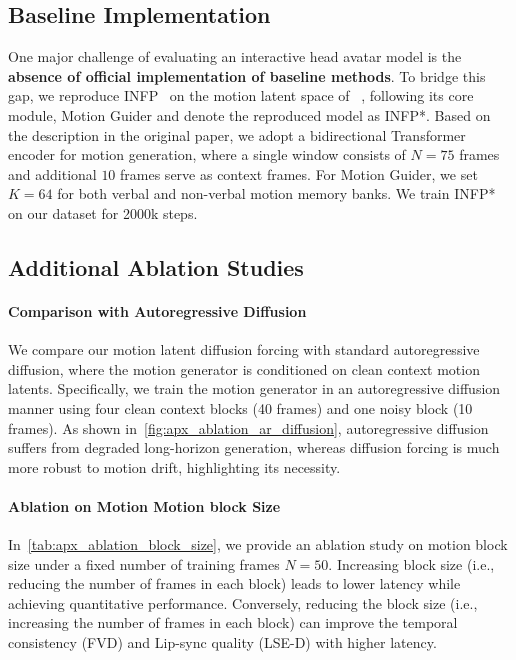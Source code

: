 \subsection{Baseline Implementation}
One major challenge of evaluating an interactive head avatar model is the \textbf{absence of official implementation of baseline methods}. To bridge this gap, we reproduce INFP~\citep{infp} on the motion latent space of ~\citep{float}, following its core module, Motion Guider and denote the reproduced model as INFP*. Based on the description in the original paper, we adopt a bidirectional Transformer encoder for motion generation, where a single window consists of $N=75$ frames and additional $10$ frames serve as context frames. For Motion Guider, we set $K=64$ for both verbal and non-verbal motion memory banks. We train INFP* on our dataset for 2000k steps.

\subsection{Additional Ablation Studies}\label{sec:apx_additional_ablation}
\paragraph{Comparison with Autoregressive Diffusion} We compare our motion latent diffusion forcing with standard autoregressive diffusion, where the motion generator is conditioned on clean context motion latents. Specifically, we train the motion generator in an autoregressive diffusion manner using four clean context blocks (40 frames) and one noisy block (10 frames). As shown in~\cref{fig:apx_ablation_ar_diffusion}, autoregressive diffusion suffers from degraded long-horizon generation, whereas diffusion forcing is much more robust to motion drift, highlighting its necessity.

\paragraph{Ablation on Motion Motion block Size} In~\cref{tab:apx_ablation_block_size}, we provide an ablation study on motion block size under a fixed number of training frames $N=50$. Increasing block size (i.e., reducing the number of frames in each block) leads to lower latency while achieving quantitative performance. Conversely, reducing the block size (i.e., increasing the number of frames in each block) can improve the temporal consistency (FVD) and Lip-sync quality (LSE-D) with higher latency.

